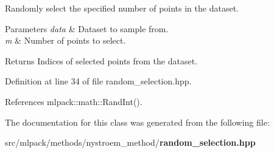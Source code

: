 Randomly select the specified number of points in the dataset. 


\begin{DoxyParams}{Parameters}
{\em data} & Dataset to sample from. \\
\hline
{\em m} & Number of points to select. \\
\hline
\end{DoxyParams}
\begin{DoxyReturn}{Returns}
Indices of selected points from the dataset. 
\end{DoxyReturn}


Definition at line 34 of file random\-\_\-selection.\-hpp.



References mlpack\-::math\-::\-Rand\-Int().



The documentation for this class was generated from the following file\-:\begin{DoxyCompactItemize}
\item 
src/mlpack/methods/nystroem\-\_\-method/{\bf random\-\_\-selection.\-hpp}\end{DoxyCompactItemize}
